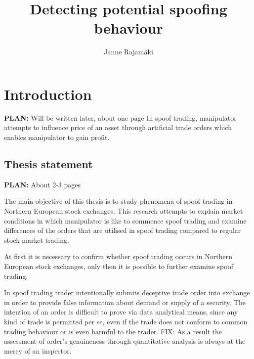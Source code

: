 \documentclass{tut-thesis}
\author 		{Janne Rajamäki}
\title 		[Potentiaalisten valekauppojen tunnistaminen]
			{Detecting potential spoofing behaviour}
\date 		{\Today}		%
\begin{document}
\maketitle

\frontmatter
\begin{abstract}
	\blindtext
\end{abstract}

\begin{otherlanguage}{finnish}
\begin{abstract}
\end{abstract}
\end{otherlanguage}

\tableofcontents


\mainmatter
\chapter{Introduction}
\textbf{PLAN:} Will be written later, about one page 
In spoof trading, manipulator attempts to influence price of an asset through artificial trade orders which enables manipulator to gain profit.

\section{Thesis statement}
\textbf{PLAN:} About 2-3 pages

The main objective of this thesis is to study phenomena of spoof trading in Northern European stock exchanges. This research attempts to explain market conditions in which manipulator is like to commence spoof trading and examine differences of the orders that are utilised in spoof trading compared to regular stock market trading. 


At first it is necessary to confirm whether spoof trading occurs in Northern European stock exchanges, only then it is possible to further examine spoof trading. 

In spoof trading trader intentionally submits deceptive trade order into exchange in order to provide false information about demand or supply of a security. The intention of an order is difficult to prove via data analytical means, since any kind of trade is permitted per se, even if the trade does not conform to common trading behaviour or is even harmful to the trader. FIX: As a result the assessment of order's genuineness through quantitative analysis is always at the mercy of an inspector.
\end{document}
